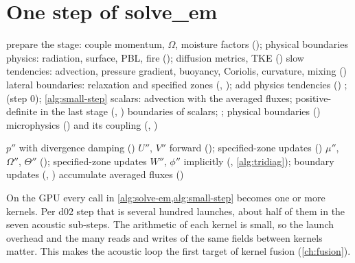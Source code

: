 \section{One step of solve\_em}

\begin{algorithm}[ht]
\caption{One large step of  for one domain (simplified; the case's options). Physics and fire are
called inside RK stage 1, before the slow tendencies are formed.}
\label{alg:solve-em}
\begin{algorithmic}[1]
  \State prepare the stage: couple momentum, $\Omega$, moisture factors (); physical boundaries
    \State physics: radiation, surface, PBL, fire (); diffusion metrics, TKE ()
  \EndIf
  \State slow tendencies: advection, pressure gradient, buoyancy, Coriolis, curvature, mixing ()
  \State lateral boundaries: relaxation and specified zones (, ); add physics tendencies ()
  \State {};  (step 0); 
    \State \cref{alg:small-step}
  \EndFor
  \State {}
  \State scalars: advection with the averaged fluxes; positive-definite in the last stage (, )
  \State boundaries of scalars; ; physical boundaries ()
\EndFor
\State microphysics () and its coupling (, )
\end{algorithmic}
\end{algorithm}

\begin{algorithm}[ht]
\caption{One acoustic sub-step (inside ).}
\label{alg:small-step}
\begin{algorithmic}[1]
\State $p''$ with divergence damping ()
\State $U''$, $V''$ forward (); specified-zone updates ()
\State $\mu''$, $\Omega''$, $\Theta''$ (); specified-zone updates
\State $W''$, $\phi''$ implicitly (, \cref{alg:tridiag}); boundary updates (, )
\State accumulate averaged fluxes ()
\end{algorithmic}
\end{algorithm}

\begin{portnote}
On the GPU every call in \cref{alg:solve-em,alg:small-step} becomes one or more kernels. Per d02 step that is several
hundred launches, about half of them in the seven acoustic sub-steps. The arithmetic of each kernel is small, so the
launch overhead and the many reads and writes of the same fields between kernels matter. This makes the acoustic
loop the first target of kernel fusion (\cref{ch:fusion}).
\end{portnote}
